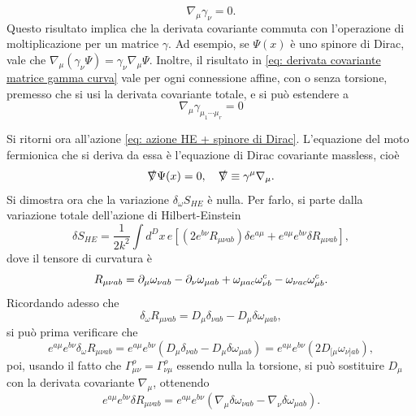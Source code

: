 \begin{equation}
\label{eq: derivata covariante matrice gamma curva}
    \nabla_\mu\gamma_\nu = 0.
\end{equation}
Questo risultato implica che la derivata covariante commuta con l'operazione di moltiplicazione per un matrice $\gamma$. Ad esempio, se $\Psi(x)$ è uno spinore di Dirac, vale che $\nabla_\mu(\gamma_\nu\Psi) = \gamma_\nu\nabla_\mu\Psi$. Inoltre, il risultato in \eqref{eq: derivata covariante matrice gamma curva} vale per ogni connessione affine, con o senza torsione, premesso che si usi la derivata covariante totale, e si può estendere a
\begin{equation}
    \nabla_\mu\gamma_{\mu_1\cdots\mu_r} = 0
\end{equation}

Si ritorni ora all'azione \eqref{eq: azione HE + spinore di Dirac}. L'equazione del moto fermionica che si deriva da essa è l'equazione di Dirac covariante massless, cioè
\begin{equation}
    \sl{\nabla}\Psi(x) = 0,\quad \sl{\nabla} \equiv \gamma^\mu\nabla_\mu.
\end{equation}
Si dimostra ora che la variazione $\delta_\omega S_{HE}$ è nulla. Per farlo, si parte dalla variazione totale dell'azione di Hilbert-Einstein
\begin{equation}
    \delta S_{HE} = \frac{1}{2k^2}\int d^Dx\,e[(2e^{b\nu}R_{\mu\nu ab})\delta e^{a\mu} + e^{a\mu}e^{b\nu}\delta R_{\mu\nu ab}],
\end{equation}
dove il tensore di curvatura è 
\begin{equation}
    R_{\mu\nu ab} = \p_\mu\omega_{\nu ab} - \p_\nu \omega_{\mu ab} + \omega_{\mu ac}\omega^c_{\nu b} - \omega_{\nu ac}\omega^c_{\mu b}.
\end{equation}
Ricordando adesso che 
\begin{equation}
    \delta_\omega R_{\mu\nu ab} = D_\mu\delta_{\nu ab} - D_{\mu}\delta\omega_{\mu ab},
\end{equation}
si può prima verificare che 
\begin{equation}
    e^{a\mu}e^{b\nu}\delta_\omega R_{\mu\nu ab} = e^{a\mu}e^{b\nu}(D_\mu\delta_{\nu ab} - D_{\mu}\delta\omega_{\mu ab}) = e^{a\mu}e^{b\nu}(2D_{[\mu}\omega_{\nu]ab}), 
\end{equation}
poi, usando il fatto che $\Gamma^\rho_{\mu\nu} = \Gamma^{\rho}_{\nu\mu}$ essendo nulla la torsione, si può sostituire $D_\mu$ con la derivata covariante $\nabla_\mu$, ottenendo 
\begin{equation}
    e^{a\mu}e^{b\nu}\delta R_{\mu\nu ab} = e^{a\mu}e^{b\nu}(\nabla_\mu\delta\omega_{\nu ab} - \nabla_\nu\delta\omega_{\mu ab}).
\end{equation}
